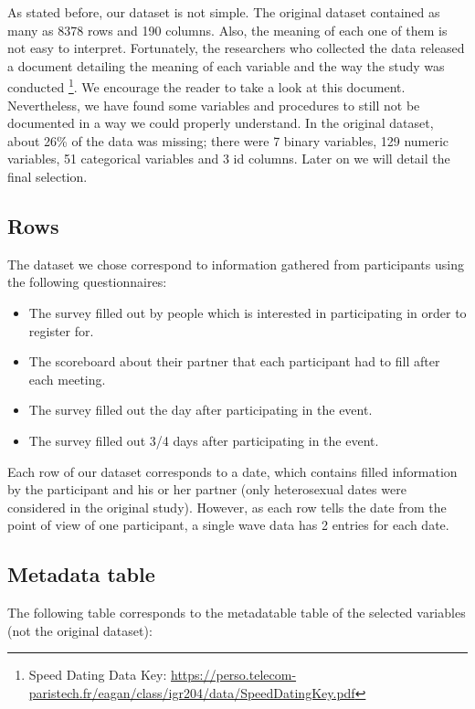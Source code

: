 
As stated before, our dataset is not simple. The original dataset contained as many as 8378 rows and 190 columns. Also, the meaning of each one of them is not easy to interpret. Fortunately, the researchers who collected the data released a document detailing the meaning of each variable and the way the study was conducted \footnote{{Speed Dating Data Key: \url{https://perso.telecom-paristech.fr/eagan/class/igr204/data/SpeedDatingKey.pdf}}}. We encourage the reader to take a look at this document. Nevertheless, we have found some variables and procedures to still not be documented in a way we could properly understand. In the original dataset, about 26\% of the data was missing; there were 7 binary variables, 129 numeric variables, 51 categorical variables and 3 id columns. Later on we will detail the final selection.

\subsection{Rows}
The dataset we chose correspond to information gathered from participants using the following questionnaires:
\begin{itemize}
    \item The survey filled out by people which is interested in participating in order to register for.
    \item The scoreboard about their partner that each participant had to fill after each meeting.
    \item The survey filled out the day after participating in the event.
    \item The survey filled out 3/4 days after participating in the event.
\end{itemize}
Each row of our dataset corresponds to a date, which contains filled information by the participant and his or her partner (only heterosexual dates were considered in the original study). However, as each row tells the date from the point of view of one participant, a single wave data has 2 entries for each date.

\subsection{Metadata table}




The following table corresponds to the metadatable table of the selected variables (not the original dataset):

